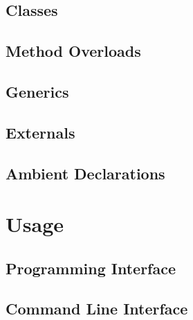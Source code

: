 \subsection{Classes}

\subsection{Method Overloads}

\subsection{Generics}

\subsection{Externals}

\subsection{Ambient Declarations}

\section{Usage}
\label{sec:usage}

\subsection{Programming Interface}
\label{sec:usage-api}

\subsection{Command Line Interface}
\label{sec:usage-cli}
